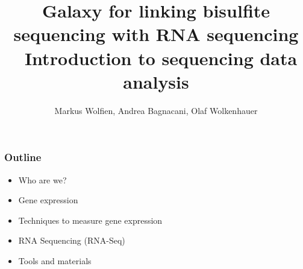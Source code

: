\documentclass[x11names, svgnames]{beamer}
\title{Galaxy for linking bisulfite sequencing with RNA sequencing \textendash\ Introduction to sequencing data analysis}
\author{Markus Wolfien, Andrea Bagnacani, Olaf Wolkenhauer}
\begin{document}
%
%



%
%
\newcommand{\one}{Who are we?}
\newcommand{\two}{Gene expression}
\newcommand{\three}{Techniques to measure gene expression}
\newcommand{\four}{RNA Sequencing (RNA-Seq)}
\newcommand{\five}{Tools and materials}
\begin{frame}
  \frametitle{Outline}
  \begin{itemize}
    \itemsep1em
    \item \one
    \item \two
    \item \three
    \item \four
    \item \five
  \end{itemize}
\end{frame}
\end{document}

